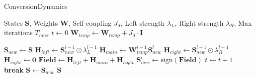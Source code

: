 \documentclass[a4paper,12pt]{report}
\begin{document}
\begin{algorithm}
\caption{ConversionDynamics}
\label{alg:conversion_dynamics}
\begin{algorithmic}[1]
\scriptsize
\Require States $\mathbf{S}$, Weights $\mathbf{W}$, Self-coupling $J_d$, 
Left strength $\lambda_{L}$, Right strength $\lambda_{R}$, Max iterations $T_{max}$
\Statex
\State $t \gets 0$
\State $\mathbf{W}_{temp} \gets \mathbf{W}_{temp} + J_d \cdot \mathbf{I}$

    \State $\mathbf{S}_{new} \gets \mathbf{S}$
    \Statex
     
        \State $\mathbf{H}_{left} \gets \mathbf{S}_{new}^{l-1} \odot \lambda_{L}^{l-1}$
        \State $\mathbf{H}_{main} \gets \mathbf{W}_{temp}^{l-1} \mathbf{S}_{new}^l$
            \State $\mathbf{H}_{right} \gets \mathbf{S}_{new}^{l+1} \odot \lambda_{R}^{l-1}$
        \Else
            \State $\mathbf{H}_{right} \gets \mathbf{0}$
        \EndIf
        \State $\mathbf{Field} \gets \mathbf{H}_{left} + \mathbf{H}_{main} + \mathbf{H}_{right}$
        \State $\mathbf{S}_{new}^l \gets \text{sign}(\mathbf{Field})$
    \EndFor
    \Statex
    \State $t \gets t + 1$
     
        \State \textbf{break}
    \EndIf
    \State $\mathbf{S} \gets \mathbf{S}_{new}$
\EndWhile
\Statex
\State \Return $\mathbf{S}$
\end{algorithmic}
\end{algorithm}
\end{document}
